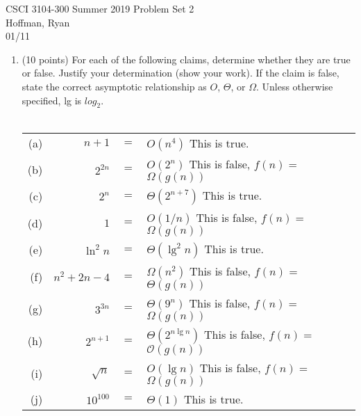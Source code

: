 \documentclass[12pt]{article}
\begin{document}
	CSCI 3104-300 Summer 2019 \hfill Problem Set 2 \\
	Hoffman, Ryan \\
	01/11

	\hrulefill

	\begin{enumerate}

		\item	(10 points) For each of the following claims, determine whether they are true or false. 
		Justify your determination (show your work). If the claim is false, state the correct asymptotic relationship 
		as $O$, $\Theta$, or $\Omega$. Unless otherwise specified, lg is $log_2$.\\ \\
		\begin{tabular}{rrcl}
		\vspace{1mm}(a) & $n+1$& $=$ & $O(n^{4})$ This is true. \\
		\vspace{1mm}(b) & $2^{2n}$& $=$ & $O(2^{n})$  This is false, $f(n)=$$\Omega(g(n))$ \\
		\vspace{1mm}(c) & $2^{n}$& $=$ & $\Theta(2^{n+7})$  This is true. \\
		\vspace{1mm}(d) & $1$& $=$ & $O(1/n)$ This is false, $f(n)=$$\Omega(g(n))$ \\
		\vspace{1mm}(e) & $\ln^{2}n$& $=$ & $\Theta(\lg^{2}n)$  This is true. \\
		\vspace{1mm}(f) & $n^{2}+2n-4$& $=$ & $\Omega(n^{2})$ This is false, $f(n)=$$\Theta(g(n))$ \\
		\vspace{1mm}(g) & $3^{3n}$& $=$ & $\Theta(9^{n})$  This is false, $f(n)=$$\Omega(g(n))$ \\
		\vspace{1mm}(h) & $2^{n+1}$& $=$ & $\Theta(2^{n\lg n})$  This is false, $f(n)=$$\mathcal{O}(g(n))$ \\
		\vspace{1mm}(i) & $\sqrt{n}$& $=$ & $O(\lg n)$   This is false, $f(n)=$$\Omega(g(n))$ \\
		\vspace{1mm}(j) & $10^{100}$& $=$ & $\Theta(1)$  This is true. \\
		\end{tabular}	
		\newpage


\end{enumerate}
\end{document}
